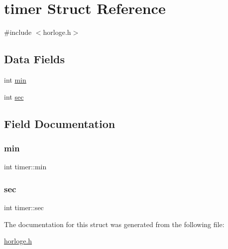 \hypertarget{structtimer}{}\section{timer Struct Reference}
\label{structtimer}


{\ttfamily \#include $<$horloge.\+h$>$}

\subsection*{Data Fields}
\begin{DoxyCompactItemize}
\item 
int \hyperlink{structtimer_ab6e316bed36d7d86f4c326a2bff3f989}{min}
\item 
int \hyperlink{structtimer_adf1c1abd803dda0b69234217f0e25199}{sec}
\end{DoxyCompactItemize}


\subsection{Field Documentation}
\mbox{\label{structtimer_ab6e316bed36d7d86f4c326a2bff3f989}} 
\subsubsection{\texorpdfstring{min}{min}}
{\footnotesize\ttfamily int timer\+::min}

\mbox{\label{structtimer_adf1c1abd803dda0b69234217f0e25199}} 
\subsubsection{\texorpdfstring{sec}{sec}}
{\footnotesize\ttfamily int timer\+::sec}



The documentation for this struct was generated from the following file\+:\begin{DoxyCompactItemize}
\item 
\hyperlink{horloge_8h}{horloge.\+h}\end{DoxyCompactItemize}
